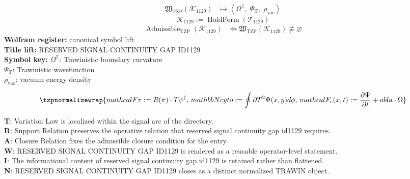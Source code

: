 \noindent
\begin{minipage}[t]{0.48\linewidth}
\begingroup
\small
\[
\begin{aligned}
\mathfrak{W}_{\mathrm{TZP}}\!\left(\mathcal{K}_{1129}\right)
&\longmapsto
\left\langle \Omega^{\mathbb{T}},\; \Psi_{\mathrm{T}},\; \rho_{\mathrm{vac}} \right\rangle
\end{aligned}
\]
\[
\mathcal{K}_{1129}
:=
\operatorname{HoldForm}\!\left(\mathcal{T}_{1129}\right)
\]
\[
\begin{aligned}
\operatorname{Admissible}_{\mathrm{TZP}}\!\left(\mathcal{K}_{1129}\right)
&\Longleftrightarrow
\mathfrak{W}_{\mathrm{TZP}}\!\left(\mathcal{K}_{1129}\right)\not\equiv\varnothing
\end{aligned}
\]
\textbf{Wolfram register:} canonical symbol lift\\
\textbf{Title lift:} RESERVED SIGNAL CONTINUITY GAP ID1129\\
\textbf{Symbol key:} \(\Omega^{\mathbb{T}}\): Trawinistic boundary curvature\\ \(\Psi_{\mathrm{T}}\): Trawinistic wavefunction\\ \(\rho_{\mathrm{vac}}\): vacuum energy density
\par
\endgroup
\end{minipage}\hfill
\begin{minipage}[t]{0.48\linewidth}
\[
\tzpnormalizewrap{mathcal{F} {\tau}:=R(\pi)\cdot T {\psi}^{\dagger},\,mathbb{N} {cyto}:=\oint {\partial T^{2}}\Psi(x,y)d\phi,\,mathcal{F}_{e}(x,t):=\frac{\partial\Psi}{\partial t}+ abla\cdot\Omega}
\]

\small
\textbf{T}: Variation Law is localized within the signal arc of the directory.\\
\textbf{R}: Support Relation preserves the operative relation that reserved signal continuity gap id1129 requires.\\
\textbf{A}: Closure Relation fixes the admissible closure condition for the entry.\\
\textbf{W}: RESERVED SIGNAL CONTINUITY GAP ID1129 is rendered as a reusable operator-level statement.\\
\textbf{I}: The informational content of reserved signal continuity gap id1129 is retained rather than flattened.\\
\textbf{N}: RESERVED SIGNAL CONTINUITY GAP ID1129 closes as a distinct normalized TRAWIN object.
\normalsize
\end{minipage}

